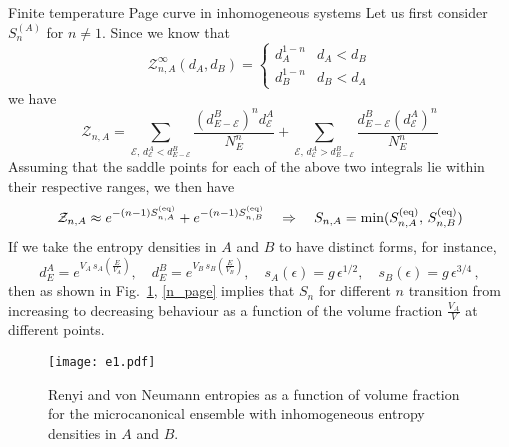\documentclass[a4paper,11pt]{article}
\newcommand{\be}{\begin{equation}}
\newcommand{\ee}{\end{equation}}
\newcommand\sE{{\ensuremath{{\mathcal E}}}}
\newcommand\sZ{{\mathcal Z}}
\begin{document}
\begin{enumerate}
\begin{appendix}
\begin{section}{Finite temperature Page curve in inhomogeneous systems}
Let us first consider $S_n^{ (A)}$ for $n\neq 1$. Since we know that 
\be 
\sZ_{n,A}^{\infty}(d_A, d_{B}) = \begin{cases} 
d_A^{1-n} & d_A< d_{B} \\
d_{B}^{1-n} & d_{B}< d_{A}
\end{cases} 
\ee
we have 
\be 
\sZ_{n,A} = \sum_{\sE, \, d^A_{\sE}< d^{B}_{E-\sE}} \frac{(d^{B}_{E-\sE})^n d^A_{\sE} }{N_E^n} + \sum_{\sE, \, d^A_{\sE}> d^{B}_{E-\sE}} \frac{d^{B}_{E-\sE} (d^A_{\sE})^n}{N_E^n} 
\ee
Assuming that the saddle points for each of the above two integrals lie within their respective ranges, we then have 
\be 
\sZ_{n,A} \approx e^{-(n-1)S_{n, A}^{\rm (eq)}} + e^{-(n-1)S_{n, B}^{\rm (eq)}} \quad \Rightarrow \quad
S_{n,A} = \text{min}(S_{n, A}^{\rm (eq)}, \, S_{n, B}^{\rm (eq)}) \label{n_page}
\ee
If we take the entropy densities in $A$ and $B$ to have distinct forms, for instance, 
\be 
d^A_{E} = e^{V_A \, s_A(\frac{E}{V_A})}, \quad d^{B}_{E} = e^{V_{B} \, s_{B}(\frac{E}{V_{B}})}, \quad s_A(\epsilon) = g \, \epsilon^{1/2}, \quad s_{B}(\epsilon) = g \, \epsilon^{3/4} \, , \label{ahalf}
\ee 
then as shown in Fig.~\ref{fig:n_mc}, \eqref{n_page} implies that $S_n$ for different $n$ transition from increasing to decreasing behaviour as a function of the volume fraction $\frac{V_A}{V}$ at different points. 

 \begin{figure}[] 
 \begin{center} 
 \texttt{[image: e1.pdf]}
 \end{center}
 \caption{Renyi and von Neumann entropies as a function of volume fraction for the microcanonical ensemble with inhomogeneous entropy densities in $A$ and $B$.}
 \label{fig:n_mc}
 \end{figure} 
\end{section} 



\end{appendix}
\end{enumerate}
\end{document}
